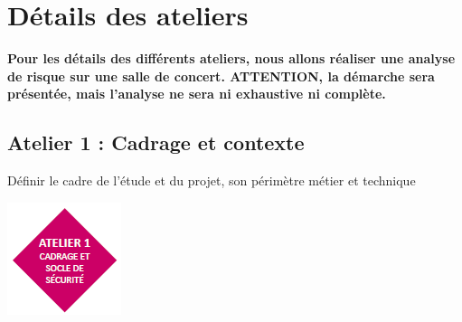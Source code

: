 \documentclass[french, 12pt]{article}%
\newcommand{\titreencadre}{Titre}
\newenvironment{encadre}[1]{\renewcommand{\titreencadre}{#1}
	\begin{mdframed}[style=encadrestyle]
	\vspace{0.5\baselineskip}
	}{%
	\end{mdframed}}
\begin{document}
\section{Détails des ateliers}

\textbf{Pour les détails des différents ateliers, nous allons réaliser une analyse de risque sur une salle de concert. ATTENTION, la démarche sera présentée, mais l'analyse ne sera ni exhaustive ni complète. }

\subsection{Atelier 1 : Cadrage et contexte}
\begin{encadre}{Objectif}
Définir le cadre de l’étude et du projet, son périmètre métier et technique
\end{encadre}

\begin{center}
\includegraphics[scale=0.8]{./ressource/logoA1.png}
\end{center}
\end{document}

